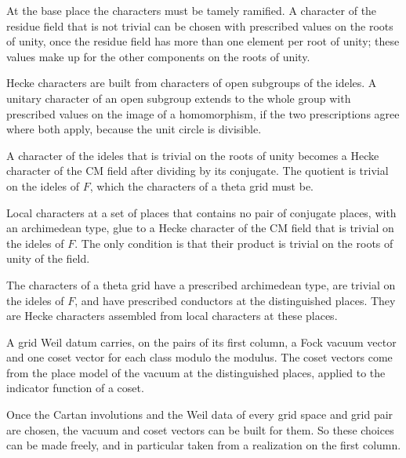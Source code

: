 At the base place the characters must be tamely ramified. A character of the residue field that is not trivial
can be chosen with prescribed values on the roots of unity, once the residue field has more than one element
per root of unity; these values make up for the other components on the roots of unity.

Hecke characters are built from characters of open subgroups of the ideles. A unitary character of an open
subgroup extends to the whole group with prescribed values on the image of a homomorphism, if the two
prescriptions agree where both apply, because the unit circle is divisible.

A character of the ideles that is trivial on the roots of unity becomes a Hecke character of the CM field after
dividing by its conjugate. The quotient is trivial on the ideles of $F$, which the characters of a theta grid
must be.

Local characters at a set of places that contains no pair of conjugate places, with an archimedean type, glue
to a Hecke character of the CM field that is trivial on the ideles of $F$. The only condition is that their
product is trivial on the roots of unity of the field.

The characters of a theta grid have a prescribed archimedean type, are trivial on the ideles of $F$, and have
prescribed conductors at the distinguished places. They are Hecke characters assembled from local characters
at these places.

A grid Weil datum carries, on the pairs of its first column, a Fock vacuum vector and one coset vector for each class
modulo the modulus. The coset vectors come from the place model of the vacuum at the distinguished places, applied to
the indicator function of a coset.

Once the Cartan involutions and the Weil data of every grid space and grid pair are chosen, the vacuum and coset
vectors can be built for them. So these choices can be made freely, and in particular taken from a realization on
the first column.

